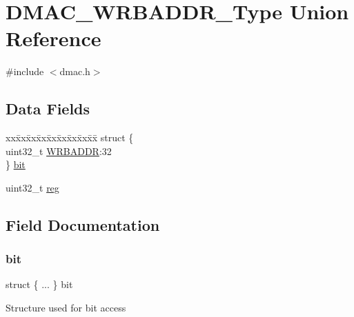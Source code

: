 \hypertarget{union_d_m_a_c___w_r_b_a_d_d_r___type}{}\section{D\+M\+A\+C\+\_\+\+W\+R\+B\+A\+D\+D\+R\+\_\+\+Type Union Reference}
\label{union_d_m_a_c___w_r_b_a_d_d_r___type}


{\ttfamily \#include $<$dmac.\+h$>$}

\subsection*{Data Fields}
\begin{DoxyCompactItemize}
\item 
\begin{tabbing}
xx\=xx\=xx\=xx\=xx\=xx\=xx\=xx\=xx\=\kill
struct \{\\
\>uint32\_t \mbox{\hyperlink{union_d_m_a_c___w_r_b_a_d_d_r___type_abc7ae3c9e65a203411f8987ef5e2c797}{WRBADDR}}:32\\
\} \mbox{\hyperlink{union_d_m_a_c___w_r_b_a_d_d_r___type_a7751e26c0f657e9eda6eebe7ea471401}{bit}}\\

\end{tabbing}\item 
uint32\+\_\+t \mbox{\hyperlink{union_d_m_a_c___w_r_b_a_d_d_r___type_a6b91636401516a477989a336376d7b40}{reg}}
\end{DoxyCompactItemize}


\subsection{Field Documentation}
\mbox{\label{union_d_m_a_c___w_r_b_a_d_d_r___type_a7751e26c0f657e9eda6eebe7ea471401}} 
\subsubsection{\texorpdfstring{bit}{bit}}
{\footnotesize\ttfamily struct \{ ... \}   bit}

Structure used for bit access \mbox{\label{union_d_m_a_c___w_r_b_a_d_d_r___type_a6b91636401516a477989a336376d7b40}} 
